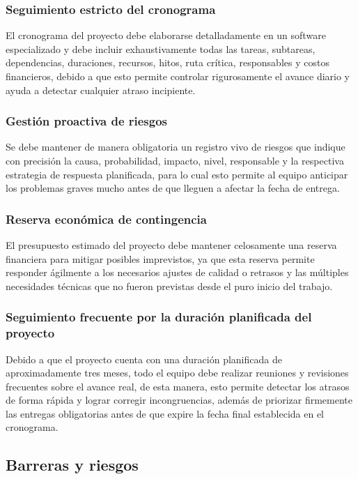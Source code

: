 \documentclass[11pt,spanish]{article}
\begin{document}
\subsubsection{Seguimiento estricto del cronograma}

El cronograma del proyecto debe elaborarse detalladamente en un software especializado y debe incluir exhaustivamente todas las tareas, subtareas, dependencias, duraciones, recursos, hitos, ruta crítica, responsables y costos financieros, debido a que esto permite controlar rigurosamente el avance diario y ayuda a detectar cualquier atraso incipiente.

\subsubsection{Gestión proactiva de riesgos}

Se debe mantener de manera obligatoria un registro vivo de riesgos que indique con precisión la causa, probabilidad, impacto, nivel, responsable y la respectiva estrategia de respuesta planificada, para lo cual esto permite al equipo anticipar los problemas graves mucho antes de que lleguen a afectar la fecha de entrega.

\subsubsection{Reserva económica de contingencia}

El presupuesto estimado del proyecto debe mantener celosamente una reserva financiera para mitigar posibles imprevistos, ya que esta reserva permite responder ágilmente a los necesarios ajustes de calidad o retrasos y las múltiples necesidades técnicas que no fueron previstas desde el puro inicio del trabajo.

\subsubsection{Seguimiento frecuente por la duración planificada del proyecto}

Debido a que el proyecto cuenta con una duración planificada de aproximadamente tres meses, todo el equipo debe realizar reuniones y revisiones frecuentes sobre el avance real, de esta manera, esto permite detectar los atrasos de forma rápida y lograr corregir incongruencias, además de priorizar firmemente las entregas obligatorias antes de que expire la fecha final establecida en el cronograma.

\subsection{Barreras y riesgos}
\end{document}
